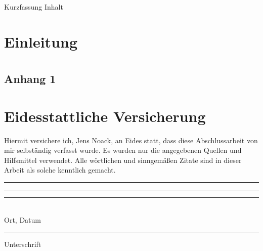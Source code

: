 \documentclass[12pt,a4paper]{report}
\begin{document}
Kurzfassung Inhalt

\tableofcontents
\newpage
\chapter{Einleitung}\label{chap:Einleitung}

\begin{thebibliography}{99}

\end{thebibliography}
\appendix
\chapter[Anhang]{}
\newpage
\section{Anhang 1}

\chapter*{Eidesstattliche Versicherung} %
Hiermit versichere ich, Jens Noack, an Eides statt, dass diese Abschlussarbeit von mir selbständig verfasst wurde. Es wurden nur die angegebenen Quellen und Hilfsmittel verwendet. Alle wörtlichen und sinngemäßen Zitate sind in dieser Arbeit als solche kenntlich gemacht.
\\[2cm]
\noindent\rule{0.35\textwidth}{0.3pt}\rule{0.2\textwidth}{0pt}\rule{0.45\textwidth}{0.3pt}
\\Ort, Datum\rule{0.418\textwidth}{0pt}Unterschrift
\end{document}
